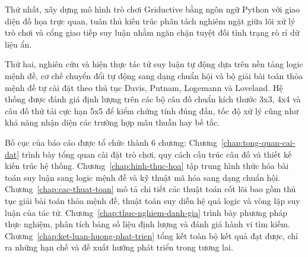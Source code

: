 Thứ nhất, xây dựng mô hình trò chơi Griductive bằng ngôn ngữ Python với giao diện đồ họa trực quan, tuân thủ kiến trúc phân tách nghiêm ngặt giữa lõi xử lý trò chơi và cổng giao tiếp suy luận nhằm ngăn chặn tuyệt đối tình trạng rò rỉ dữ liệu ẩn.

Thứ hai, nghiên cứu và hiện thực tác tử suy luận tự động dựa trên nền tảng logic mệnh đề, cơ chế chuyển đổi tự động sang dạng chuẩn hội và bộ giải bài toán thỏa mệnh đề tự cài đặt theo thủ tục Davis, Putnam, Logemann và Loveland. Hệ thống được đánh giá định lượng trên các bộ câu đố chuẩn kích thước 3x3, 4x4 và câu đố thử tải cực hạn 5x5 để kiểm chứng tính đúng đắn, tốc độ xử lý cũng như khả năng nhận diện các trường hợp mâu thuẫn hay bế tắc.

Bố cục của báo cáo được tổ chức thành 6 chương: Chương~\ref{chap:tong-quan-cai-dat} trình bày tổng quan cài đặt trò chơi, quy cách cấu trúc câu đố và thiết kế kiến trúc hệ thống. Chương~\ref{chap:hinh-thuc-hoa} tập trung hình thức hóa bài toán suy luận sang logic mệnh đề và kỹ thuật mã hóa sang dạng chuẩn hội. Chương~\ref{chap:cac-thuat-toan} mô tả chi tiết các thuật toán cốt lõi bao gồm thủ tục giải bài toán thỏa mệnh đề, thuật toán suy diễn hệ quả logic và vòng lặp suy luận của tác tử. Chương~\ref{chap:thuc-nghiem-danh-gia} trình bày phương pháp thực nghiệm, phân tích bảng số liệu định lượng và đánh giá hành vi tìm kiếm. Chương~\ref{chap:ket-luan-huong-phat-trien} tổng kết toàn bộ kết quả đạt được, chỉ ra những hạn chế và đề xuất hướng phát triển trong tương lai.
